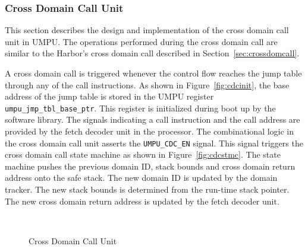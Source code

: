 \subsubsection{Cross Domain Call Unit}
\label{sec:cdcunit}
%
This section describes the design and implementation of the cross domain call unit in UMPU.
%
The operations performed during the cross domain call are similar to
the Harbor's cross domain call described in
Section~\ref{sec:crossdomcall}.
%

A cross domain call is triggered whenever the control flow reaches the
jump table through any of the call instructions.
%
As shown in Figure~\ref{fig:cdcinit}, the base address of the jump
table is stored in the UMPU register
\texttt{umpu\_jmp\_tbl\_base\_ptr}.
%
This register is initialized during boot up by the software library.
%
The signals indicating a call instruction and the call address are
provided by the fetch decoder unit in the processor.
%
The combinational logic in the cross domain call unit asserts the \texttt{UMPU\_CDC\_EN} signal.
%
This signal triggers the cross domain call state machine as shown in Figure~\ref{fig:cdcstmc}.
%
The state machine pushes the previous domain ID, stack bounds and cross domain return address onto the safe stack.
%
The new domain ID is updated by the domain tracker.
%
The new stack bounds is determined from the run-time stack pointer.
%
The new cross domain return address is updated by the fetch decoder unit.
%
\begin{figure}[htpb]
 \centering
  \mbox{
    \hspace{0.5in}
  }
  \caption{Cross Domain Call Unit}
\end{figure}   

